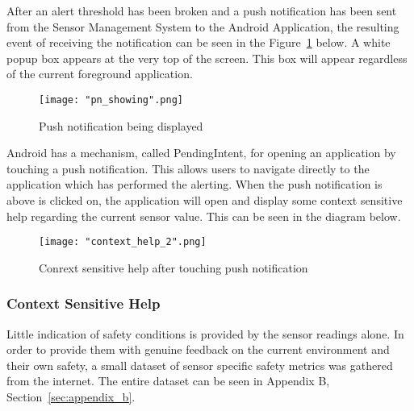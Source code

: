 \documentclass{article}
\begin{document}
\noindent
After an alert threshold has been broken and a push notification has been sent from the Sensor Management System to the Android Application, the resulting event of receiving the notification can be seen in the Figure~\ref{fig:android_pn_displayed} below. A white popup box appears at the very top of the screen. This box will appear regardless of the current foreground application. 

\begin{figure}[H]
\centering
\texttt{[image: "pn\_showing".png]}
\caption{Push notification being displayed}
\label{fig:android_pn_displayed}
\end{figure}

\noindent
Android has a mechanism, called PendingIntent, for opening an application by touching a push notification. This allows users to navigate directly to the application which has performed the alerting. When the push notification is above is clicked on, the application will open and display some context sensitive help regarding the current sensor value. This can be seen in the diagram below.

\begin{figure}[H]
\centering
\texttt{[image: "context\_help\_2".png]}
\caption{Conrext sensitive help after touching push notification}
\label{fig:android_pn_help}
\end{figure}

\subsubsection{Context Sensitive Help}
Little indication of safety conditions is provided by the sensor readings alone. In order to provide them with genuine feedback on the current environment and their own safety, a small dataset of sensor specific safety metrics was gathered from the internet. The entire dataset can be seen in Appendix B, Section~\ref{sec:appendix_b}.\\\\
\end{document}
